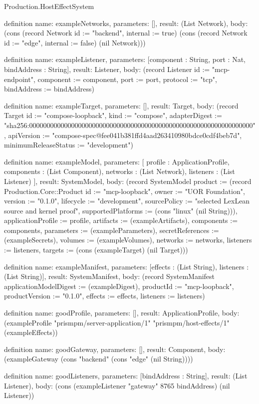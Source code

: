\begin{lexlean}{Production.HostEffectSystem}
\begin{semanticmodule}
definition{
  name: exampleNetworks,
  parameters: [],
  result: (List Network),
  body: (cons (record Network {id := "backend", internal := true}) (cons (record Network {id := "edge", internal := false}) (nil Network)))
}

definition{
  name: exampleListener,
  parameters: [component : String, port : Nat, bindAddress : String],
  result: Listener,
  body: (record Listener {id := "mcp-endpoint", component := component, port := port, protocol := "tcp", bindAddress := bindAddress})
}

definition{
  name: exampleTarget,
  parameters: [],
  result: Target,
  body: (record Target {id := "compose-loopback", kind := "compose", adapterDigest := "sha256:0000000000000000000000000000000000000000000000000000000000000000", apiVersion := "compose-spec@fee041b381ffd4aad263410980bdce0cdf4beb7d", minimumReleaseStatus := "development"})
}

definition{
  name: exampleModel,
  parameters: [
    profile : ApplicationProfile,
    components : (List Component),
    networks : (List Network),
    listeners : (List Listener)
  ],
  result: SystemModel,
  body: (record SystemModel {product := (record Production.Core::Product {id := "mcp-loopback", owner := "UOR Foundation", version := "0.1.0", lifecycle := "development", sourcePolicy := "selected LexLean source and kernel proof", supportedPlatforms := (cons "linux" (nil String))}), applicationProfile := profile, artifacts := (exampleArtifacts), components := components, parameters := (exampleParameters), secretReferences := (exampleSecrets), volumes := (exampleVolumes), networks := networks, listeners := listeners, targets := (cons (exampleTarget) (nil Target))})
}

definition{
  name: exampleManifest,
  parameters: [effects : (List String), listeners : (List String)],
  result: SystemManifest,
  body: (record SystemManifest {applicationModelDigest := (exampleDigest), productId := "mcp-loopback", productVersion := "0.1.0", effects := effects, listeners := listeners})
}

definition{
  name: goodProfile,
  parameters: [],
  result: ApplicationProfile,
  body: (exampleProfile "prismpm/server-application/1" "prismpm/host-effects/1" (exampleEffects))
}

definition{
  name: goodGateway,
  parameters: [],
  result: Component,
  body: (exampleGateway (cons "backend" (cons "edge" (nil String))))
}

definition{
  name: goodListeners,
  parameters: [bindAddress : String],
  result: (List Listener),
  body: (cons (exampleListener "gateway" 8765 bindAddress) (nil Listener))
}


\end{semanticmodule}
\end{lexlean}
